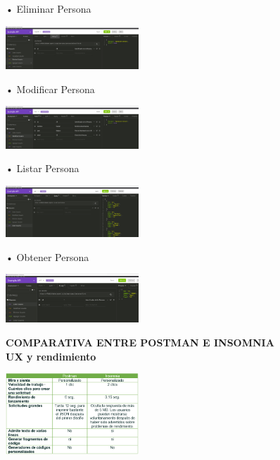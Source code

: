 \documentclass[twoside,twocolumn]{article}
\begin{document}
•	Eliminar Persona
\begin{center}
	\includegraphics[width=5cm]{./img/15.png} 
\end{center}

•	Modificar Persona
\begin{center}
	\includegraphics[width=5cm]{./img/16.png} 
\end{center}

•	Listar Persona
\begin{center}
	\includegraphics[width=5cm]{./img/17.png} 
\end{center}

•	Obtener Persona
\begin{center}
	\includegraphics[width=5cm]{./img/18.png} 
\end{center}



\textbf{COMPARATIVA ENTRE POSTMAN E INSOMNIA}\\


\textbf{UX y rendimiento}\\

\begin{center}
	\includegraphics[width=5cm]{./img/19.png} 
\end{center}
\end{document}
